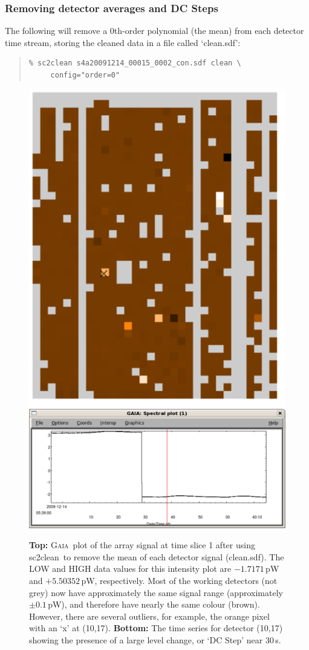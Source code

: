 \documentclass[twoside,11pt]{article}
\newcommand{\xref}[3]{#1}
\newcommand{\xlabel}[1]{}
\renewcommand{\_}{\texttt{\symbol{95}}}
\newenvironment{myquote}{\begin{quote}\begin{small}}{\end{small}\end{quote}}
\newcommand{\gaia}{\xref{\textsc{Gaia}}{sun214}{}}
\newcommand{\task}[1]{\textsf{#1}}
\newcommand{\clean}{\xref{\task{sc2clean}}{sun258}{SC2CLEAN}}
\begin{document}
\subsubsection{\xlabel{clean_average}Removing detector averages and DC Steps}

The following will remove a 0th-order polynomial (the mean) from each
detector time stream, storing the cleaned data in a file called
`clean.sdf':

\begin{myquote}
\begin{verbatim}
% sc2clean s4a20091214_00015_0002_con.sdf clean \
     config="order=0"
\end{verbatim}
\end{myquote}

\begin{figure}
\begin{center}
\includegraphics[width=0.5\linewidth]{sc19_array_mean}
\includegraphics[width=0.9\linewidth]{sc19_dcstep}
\caption{{\bf Top:} \gaia\ plot of the array signal at time slice 1
  after using \clean\ to remove the mean of each detector signal
  (clean.sdf). The LOW and HIGH data values for this intensity plot
  are $-1.7171$\,pW and $+5.50352$\,pW, respectively. Most of the
  working detectors (not grey) now have approximately the same signal
  range (approximately $\pm 0.1$\,pW), and therefore have nearly the
  same colour (brown). However, there are several outliers, for
  example, the orange pixel with an `x' at (10,17). {\bf Bottom:} The
  time series for detector (10,17) showing the presence of a large
  level change, or `DC Step' near 30\,s.}
\label{fig:array_mean}
\end{center}
\end{figure}
\end{document}
